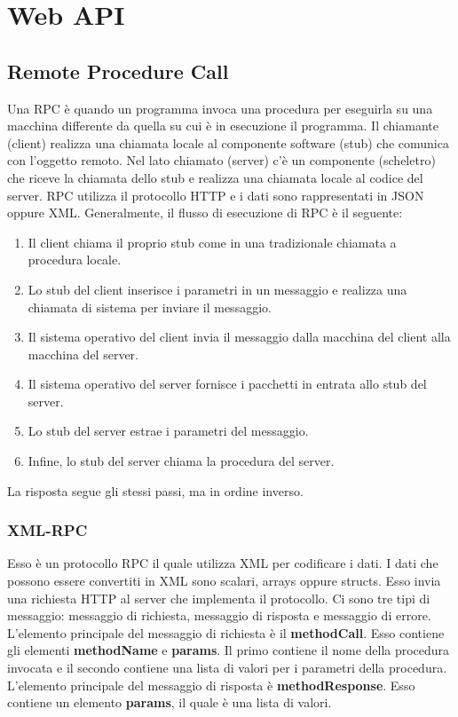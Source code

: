 \chapter{Web API}
\section{Remote Procedure Call}
Una RPC è quando un programma invoca una procedura per eseguirla su una macchina differente da quella su cui è in esecuzione il programma. Il chiamante (client) realizza una chiamata locale al componente software (stub) che comunica con l'oggetto remoto. Nel lato chiamato (server) c'è un componente (scheletro) che riceve la chiamata dello stub e realizza una chiamata locale al codice del server. RPC utilizza il protocollo HTTP e i dati sono rappresentati in JSON oppure XML. Generalmente, il flusso di esecuzione di RPC è il seguente:
\begin{enumerate}
    \item Il client chiama il proprio stub come in una tradizionale chiamata a procedura locale.
    \item Lo stub del client inserisce i parametri in un messaggio e realizza una chiamata di sistema per inviare il messaggio.
    \item Il sistema operativo del client invia il messaggio dalla macchina del client alla macchina del server.
    \item Il sistema operativo del server fornisce i pacchetti in entrata allo stub del server.
    \item Lo stub del server estrae i parametri del messaggio.
    \item Infine, lo stub del server chiama la procedura del server.
\end{enumerate}

La risposta segue gli stessi passi, ma in ordine inverso.

\subsection{XML-RPC}
Esso è un protocollo RPC il quale utilizza XML per codificare i dati. I dati che possono essere convertiti in XML sono scalari, arrays oppure structs. Esso invia una richiesta HTTP al server che implementa il protocollo. Ci sono tre tipi di messaggio: messaggio di richiesta, messaggio di risposta e messaggio di errore. L'elemento principale del messaggio di richiesta è il \textbf{methodCall}. Esso contiene gli elementi \textbf{methodName} e \textbf{params}. Il primo contiene il nome della procedura invocata e il secondo contiene una lista di valori per i parametri della procedura. L'elemento principale del messaggio di risposta è \textbf{methodResponse}. Esso contiene un elemento \textbf{params}, il quale è una lista di valori.

